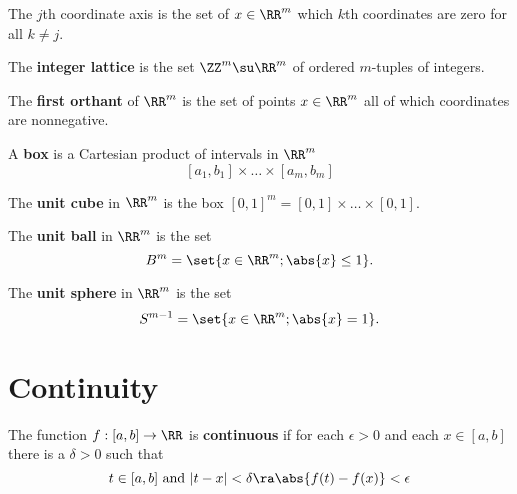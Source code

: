 \documentclass[11pt]{scrartcl}
\begin{document}
\begin{definition}
  The $j$th coordinate axis is the set of $x\in\RR^m$ which $k$th
  coordinates are zero for all $k\neq j$.
\end{definition}

\begin{definition}
  The \textbf{integer lattice} is the set $\ZZ^m \su \RR^m$ of ordered
  $m$-tuples of integers.
\end{definition}


\begin{definition}
  The \textbf{first orthant} of $\RR^m$ is the set of points
  $x\in \RR^m$ all of which coordinates are nonnegative.
\end{definition}

\begin{definition}
  A \textbf{box} is a Cartesian product of intervals in $\RR^m$
  \[ [a_1,b_1]\times\dots\times[a_m,b_m]\]
\end{definition}
\begin{definition}
  The \textbf{unit cube} in $\RR^m$ is the box
  $[0,1]^m = [0,1]\times\dots\times[0,1]$.
\end{definition}

\begin{definition}
  The \textbf{unit ball} in $\RR^m$ is the set
  \[ B^m = \set{ x\in\RR^m ; \abs{x} \leq 1 }. \]
\end{definition}
\begin{definition}
  The \textbf{unit sphere} in $\RR^m$ is the set
  \[ S^{m-1} = \set{ x\in\RR^m ; \abs{x} = 1 }. \]
\end{definition}

\section{Continuity}
\label{sec:continuity}
\begin{definition}
  The function \(f:[a,b]\to\RR\) is \textbf{continuous} if for each
  \(\epsilon > 0\) and each \(x\in[a,b]\) there is a \(\delta>0\) such that
  \[t\in [a,b] \text{\ and\ } |t-x|< \delta \ra \abs{f (t) -f(x)}<\epsilon\]
\end{definition}
\end{document}
